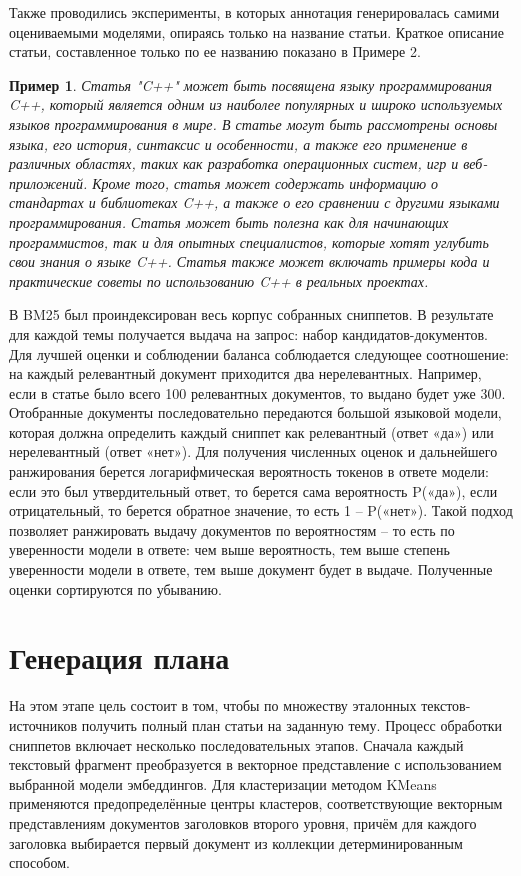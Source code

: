 \documentclass{article}
\theoremstyle{definition}
\theoremstyle{plain}
\newtheorem{remark}{Пример}
\begin{document}
Также проводились эксперименты, в которых аннотация генерировалась самими оцениваемыми моделями, опираясь только на название статьи. Краткое описание статьи, составленное только по ее названию показано в Примере 2.
\begin{remark}
Статья "C++" может быть посвящена языку программирования C++, который является одним из наиболее популярных и широко используемых языков программирования в мире.
В статье могут быть рассмотрены основы языка, его история, синтаксис и особенности, а также его применение в различных областях, таких как разработка операционных систем, игр и веб-приложений. 
Кроме того, статья может содержать информацию о стандартах и библиотеках C++, а также о его сравнении с другими языками программирования. 
Статья может быть полезна как для начинающих программистов, так и для опытных специалистов, которые хотят углубить свои знания о языке C++.
Статья также может включать примеры кода и практические советы по использованию C++ в реальных проектах. 
\end{remark}

В BM25 был проиндексирован весь корпус собранных сниппетов. В результате для каждой темы получается выдача на запрос: набор кандидатов-документов. Для лучшей оценки и соблюдении баланса соблюдается следующее соотношение: на каждый релевантный документ приходится два нерелевантных. Например, если в статье было всего 100 релевантных документов, то выдано будет уже 300. Отобранные документы последовательно передаются большой языковой модели, которая должна определить каждый сниппет как релевантный (ответ «да») или нерелевантный (ответ «нет»). Для получения численных оценок и дальнейшего ранжирования берется логарифмическая вероятность токенов в ответе модели: если это был утвердительный ответ, то берется сама вероятность P(«да»), если отрицательный, то берется обратное значение, то есть 1 – P(«нет»). 
Такой подход позволяет ранжировать выдачу документов по вероятностям – то есть по уверенности модели в ответе: чем выше вероятность, тем выше степень уверенности модели в ответе, тем выше документ будет в выдаче. Полученные оценки сортируются по убыванию. 

\section*{Генерация плана}

На этом этапе цель состоит в том, чтобы по множеству эталонных текстов-источников получить полный план статьи на заданную тему.
Процесс обработки сниппетов включает несколько последовательных этапов. 
Сначала каждый текстовый фрагмент преобразуется в векторное представление с использованием выбранной модели эмбеддингов. 
Для кластеризации методом KMeans применяются предопределённые центры кластеров, соответствующие векторным представлениям документов заголовков второго уровня, причём для каждого заголовка выбирается первый документ из коллекции детерминированным способом. 
\end{document}
